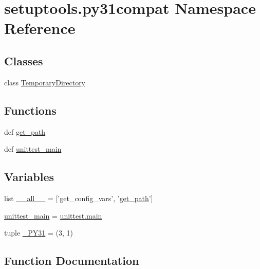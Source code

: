 \hypertarget{namespacesetuptools_1_1py31compat}{}\section{setuptools.\+py31compat Namespace Reference}
\label{namespacesetuptools_1_1py31compat}
\subsection*{Classes}
\begin{DoxyCompactItemize}
\item 
class \hyperlink{classsetuptools_1_1py31compat_1_1TemporaryDirectory}{Temporary\+Directory}
\end{DoxyCompactItemize}
\subsection*{Functions}
\begin{DoxyCompactItemize}
\item 
def \hyperlink{namespacesetuptools_1_1py31compat_a9859bfa1dec7c4cf35cbb865abc0a38f}{get\+\_\+path}
\item 
def \hyperlink{namespacesetuptools_1_1py31compat_a3d9b50aae327dae71a47dc717f457e89}{unittest\+\_\+main}
\end{DoxyCompactItemize}
\subsection*{Variables}
\begin{DoxyCompactItemize}
\item 
list \hyperlink{namespacesetuptools_1_1py31compat_a1104d06f25209ce1a2f56550ccc24cec}{\+\_\+\+\_\+all\+\_\+\+\_\+} = \mbox{[}'get\+\_\+config\+\_\+vars', '\hyperlink{namespacesetuptools_1_1py31compat_a9859bfa1dec7c4cf35cbb865abc0a38f}{get\+\_\+path}'\mbox{]}
\item 
\hyperlink{namespacesetuptools_1_1py31compat_acb943bc1c3ff699123d78a6b23581c5b}{unittest\+\_\+main} = \hyperlink{ramp_8c_acdef7a1fd863a6d3770c1268cb06add3}{unittest.\+main}
\item 
tuple \hyperlink{namespacesetuptools_1_1py31compat_a00ac352ccd435ba5b5d678e9408df64e}{\+\_\+\+P\+Y31} = (3, 1)
\end{DoxyCompactItemize}


\subsection{Function Documentation}
\hypertarget{namespacesetuptools_1_1py31compat_a9859bfa1dec7c4cf35cbb865abc0a38f}{}
